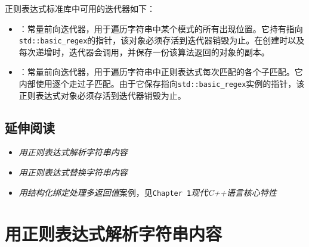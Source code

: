 
正则表达式标准库中可用的迭代器如下：



\begin{itemize}
\item {}：常量前向迭代器，用于遍历字符串中某个模式的所有出现位置。它持有指向\texttt{std::\allowbreak{}basic\_\allowbreak{}regex}的指针，该对象必须存活到迭代器销毁为止。在创建时以及每次递增时，迭代器会调用，并保存一份该算法返回的对象的副本。



\item {}：常量前向迭代器，用于遍历字符串中正则表达式每次匹配的各个子匹配。它内部使用逐个走过子匹配。由于它保存指向\texttt{std::\allowbreak{}basic\_\allowbreak{}regex}实例的指针，该正则表达式对象必须存活到迭代器销毁为止。

\end{itemize}



\subsection{延伸阅读}



\begin{itemize}
\item \textit{用正则表达式解析字符串内容}



\item \textit{用正则表达式替换字符串内容}



\item \textit{用结构化绑定处理多返回值}案例，见\texttt{Chapter 1}\textit{现代C++语言核心特性}

\end{itemize}



\section{用正则表达式解析字符串内容}


